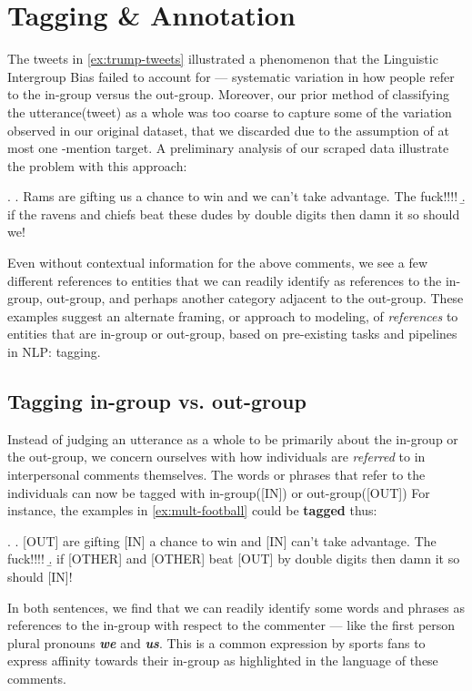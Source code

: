  


\section{Tagging \& Annotation}
\label{sec:football-prelim}

The tweets in \ref{ex:trump-tweets} illustrated a phenomenon that the Linguistic Intergroup Bias failed to account for --- systematic variation in how people refer to the in-group versus the out-group. Moreover, our prior method of classifying the utterance(tweet) as a whole was too coarse to capture some of the variation observed in our original dataset, that we discarded due to the assumption of at most one \@-mention target. A preliminary analysis of our scraped data illustrate the problem with this approach:

\ex. \label{ex:mult-football} \a. \label{ex:mult-football-a} Rams are gifting us a chance to win and we can’t take advantage. The fuck!!!!
     \b. \label{ex:mult-football-b} if the ravens and chiefs beat these dudes by double digits then damn it so should we!
     
Even without contextual information for the above comments, we see a few different references to entities that we can readily identify as references to the in-group, out-group, and perhaps another category adjacent to the out-group. These examples suggest an alternate framing, or approach to modeling, of \emph{references} to entities that are in-group or out-group, based on pre-existing tasks and pipelines in NLP: tagging.

\subsection{Tagging in-group vs. out-group}

Instead of judging an utterance as a whole to be primarily about the in-group or the out-group, we concern ourselves with how individuals are \emph{referred} to in interpersonal comments themselves. The words or phrases that refer to the individuals can now be tagged with in-group([IN]) or out-group([OUT]) For instance, the examples in \ref{ex:mult-football} could be \textbf{tagged} thus:

\ex. \a. [OUT] are gifting [IN] a chance to win and [IN] can’t take advantage. The fuck!!!!
     \b. if [OTHER] and [OTHER] beat [OUT] by double digits then damn it so should [IN]!
     
     
In both sentences, we find that we can readily identify some words and phrases as references to the in-group with respect to the commenter --- like the first person plural pronouns \textbf{\emph{we}} and \textbf{\emph{us}}. This is a common expression by sports fans to express affinity towards their in-group as highlighted in the language of these comments.

